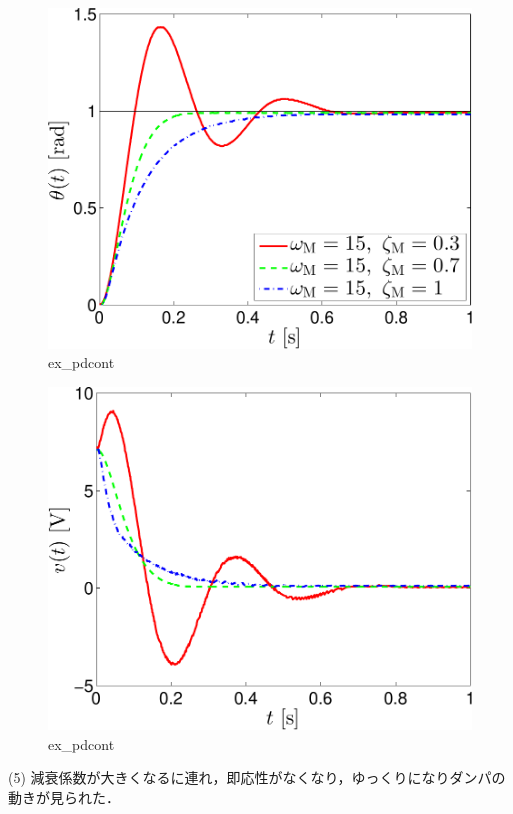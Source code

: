 \begin{figure}[h]
  \centering
  \includegraphics[scale=0.5]{sozai/figure_pdcont_angle-crop.pdf}
  \caption{ex\_pdcont}
\end{figure}

\begin{figure}[h]
  \centering
  \includegraphics[scale=0.5]{sozai/figure_pdcont_volt-crop.pdf}
  \caption{ex\_pdcont}
\end{figure}

\newpage

(5) 減衰係数が大きくなるに連れ，即応性がなくなり，ゆっくりになりダンパの動きが見られた．

